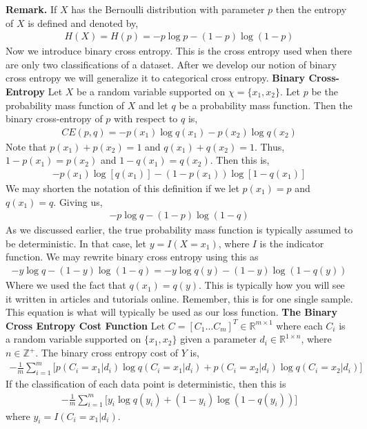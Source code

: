\documentclass[12pt]{article}
\theoremstyle{definition}
\numberwithin{equation}{section}
\newcommand{\R}{\ensuremath{\mathbb{R}}}
\begin{document}
\textbf{Remark.} If $X$ has the Bernoulli distribution with parameter $p$ then the entropy of $X$ is defined and denoted by,
\begin{gather*}
    H(X) = H(p) = -p\log p - (1-p)\log (1-p)
\end{gather*}
Now we introduce binary cross entropy. This is the cross entropy used when there are only two classifications of a dataset. After we develop our notion of binary cross entropy we will generalize it to categorical cross entropy.
 \textbf{Binary Cross-Entropy} Let $X$ be a random variable supported on $\chi = \{x_1, x_2\}$. Let $p$ be the probability mass function of $X$ and let $q$ be a probability mass function. Then the binary cross-entropy of $p$ with respect to $q$ is,
\begin{gather*}
    CE(p, q) = -p(x_1)\log q(x_1) - p(x_2)\log q(x_2)
\end{gather*}
Note that $p(x_1) + p(x_2) = 1$ and $q(x_1) + q(x_2) = 1$. Thus, $1 - p(x_1) = p(x_2)$ and $1 - q(x_1) = q(x_2)$. Then this is,
\begin{gather*}
    -p(x_1)\log [q(x_1)] - (1 - p(x_1))\log[ 1 - q(x_1)]
\end{gather*}
We may shorten the notation of this definition if we let $p(x_1) = p$ and $q(x_1) = q$. Giving us,
\begin{gather*}
    -p\log q - (1 - p)\log (1 - q)
\end{gather*}
As we discussed earlier, the true probability mass function is typically assumed to be deterministic. In that case, let $y = I(X = x_1)$, where $I$ is the indicator function. We may rewrite binary cross entropy using this as
\begin{gather*}
    -y\log q - (1 - y)\log (1 - q) = -y\log q(y) - (1-y)\log(1 - q(y))
\end{gather*}
Where we used the fact that $q(x_1) = q(y)$. This is typically how you will see it written in articles and tutorials online. Remember, this is for one single sample. This equation is what will typically be used as our loss function.
 \textbf{The Binary Cross Entropy Cost Function} Let $C = [C_1\ldots C_m]^T\in \R^{m\times 1}$ where each $C_i$ is a random variable supported on $\{x_1, x_2\}$ given a parameter $d_i\in \R^{1\times n}$, where $n\in \mathbb{Z^+}$. The binary cross entropy cost of $Y$ is,
\begin{gather*}
    -\frac{1}{m}\sum_{i=1}^m \Big[p(C_i = x_1|d_i)\log q(C_i = x_1|d_i) + p(C_i = x_2|d_i)\log q(C_i = x_2|d_i)\Big]
\end{gather*}
If the classification of each data point is deterministic, then this is
\begin{gather*}
    -\frac{1}{m}\sum_{i=1}^m \Big[ y_i\log q(y_i) + (1 - y_i)\log (1 - q(y_i))  \Big]
\end{gather*}
where $y_i = I(C_i = x_1|d_i)$.
\end{document}
